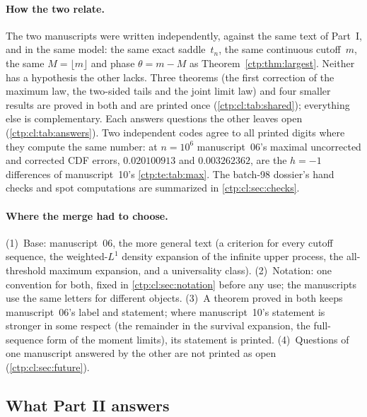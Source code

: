\documentclass[11pt,a4paper]{article}
\numberwithin{equation}{section}
\theoremstyle{definition}
\theoremstyle{remark}
\begin{document}
\paragraph{How the two relate.} The two manuscripts were written
independently, against the same text of Part~I, and in the same model:
the same exact saddle~$t_n$, the same continuous cutoff~$m$, the same
$M=\lfloor m\rfloor$ and phase $\theta=m-M$ as
Theorem~\ref{ctp:thm:largest}. Neither has a hypothesis the other lacks.
Three theorems (the first correction of the maximum law, the two-sided
tails and the joint limit law) and four smaller results are proved in both
and are printed once (\cref{ctp:cl:tab:shared}); everything else is
complementary. Each answers questions the other leaves open
(\cref{ctp:cl:tab:answers}). Two independent codes agree to all printed
digits where they compute the same number: at $n=10^6$ manuscript~06's
maximal uncorrected and corrected CDF errors, $0.020100913$ and
$0.003262362$, are the $h=-1$ differences of manuscript~10's
\cref{ctp:te:tab:max}. The batch-98 dossier's hand checks
and spot computations are summarized in \cref{ctp:cl:sec:checks}.

\paragraph{Where the merge had to choose.} (1)~Base: manuscript~06, the
more general text (a criterion for every cutoff sequence, the
weighted-$L^1$ density expansion of the infinite upper process, the
all-threshold maximum expansion, and a universality class). (2)~Notation:
one convention for both, fixed in \cref{ctp:cl:sec:notation} before any
use; the manuscripts use the same letters for different objects. (3)~A
theorem proved in both keeps manuscript~06's label and statement; where
manuscript~10's statement is stronger in some respect (the remainder in
the survival expansion, the full-sequence form of the moment limits), its
statement is printed. (4)~Questions of one manuscript answered by the other
are not printed as open (\cref{ctp:cl:sec:future}).

\subsection{What Part II answers}
\label{ctp:cl:sec:answers}
\end{document}
